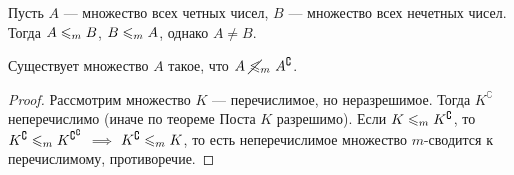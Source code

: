 \begin{corollary}
    Пусть $A$ --- множество всех четных чисел, $B$ --- множество всех нечетных чисел.
    Тогда $A \leqslant_{m} B$, $B \leqslant_{m} A$, однако $A \neq B$.
\end{corollary}

\begin{corollary}
    Существует множество $A$ такое, что $A~\cancel{\leqslant}_{m}~A^{\complement}$.
\end{corollary}
\begin{proof}
    Рассмотрим множество $K$ --- перечислимое, но неразрешимое.
    Тогда $K^{\complement}$ неперечислимо (иначе по теореме Поста $K$ разрешимо).
    Если $K \leqslant_{m} K^{\complement}$, то $K^{\complement} \leqslant_{m} K^{\complement^{\complement}}$ $\implies$ $K^{\complement} \leqslant_{m} K$, то есть неперечислимое множество $m$-сводится к перечислимому, противоречие.
\end{proof}

